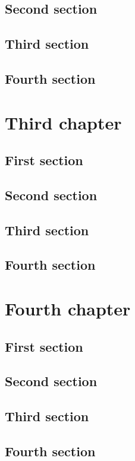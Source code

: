 \documentclass{researchbook}
\begin{document}
\section{Second section}\lipsum
\section{Third section}\lipsum
\section{Fourth section}\lipsum


\chapter{Third chapter}

\section{First section}\lipsum
\section{Second section}\lipsum
\section{Third section}\lipsum
\section{Fourth section}\lipsum


\chapter{Fourth chapter}

\section{First section}\lipsum
\section{Second section}\lipsum
\section{Third section}\lipsum
\section{Fourth section}\lipsum
\end{document}
